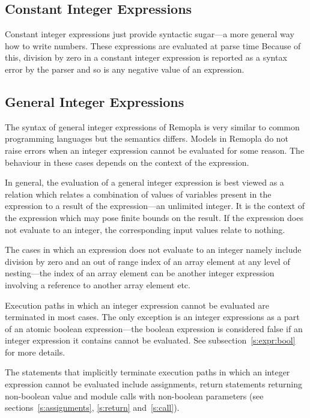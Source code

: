 \documentclass[a4paper,11pt,titlepage,english]{article}
\begin{document}
\subsection{Constant Integer Expressions}

Constant integer expressions just provide syntactic sugar---a more general
way how to write numbers. These expressions are evaluated at parse time
Because of this, division by zero in a constant integer
expression is reported as a syntax error by the parser and so is any negative
value of an expression.


\subsection{General Integer Expressions\label{s:expr:int}}

The syntax of general integer expressions of Remopla is very similar to
common programming languages but the semantics differs. Models in Remopla
do not raise errors when an integer expression cannot be evaluated for some
reason. The behaviour in these cases depends on the context of the
expression.

In general, the evaluation of a general integer expression is best viewed
as a relation which relates a combination of values of variables present in
the expression to a result of the expression---an unlimited integer. It is
the context of the expression which may pose finite bounds on the result. If
the expression does not evaluate to an integer, the corresponding input
values relate to nothing.

The cases in which an expression does not evaluate to an integer namely include
division by zero and an out of range index of an array element at any level
of nesting---the index of an array element can be another integer expression
involving a reference to another array element etc.

Execution paths in which an integer expression cannot be evaluated are
terminated in most cases. The only exception is an integer expressions as
a part of an atomic boolean expression---the boolean expression is
considered false if an integer expression it contains cannot be evaluated.
See subsection~\ref{s:expr:bool} for more details.

The statements that implicitly terminate execution paths in which an
integer expression cannot be evaluated include assignments, return
statements returning non-boolean value and module calls with non-boolean
parameters (see sections~\ref{s:assignments}, \ref{s:return}
and~\ref{s:call}).
\end{document}
